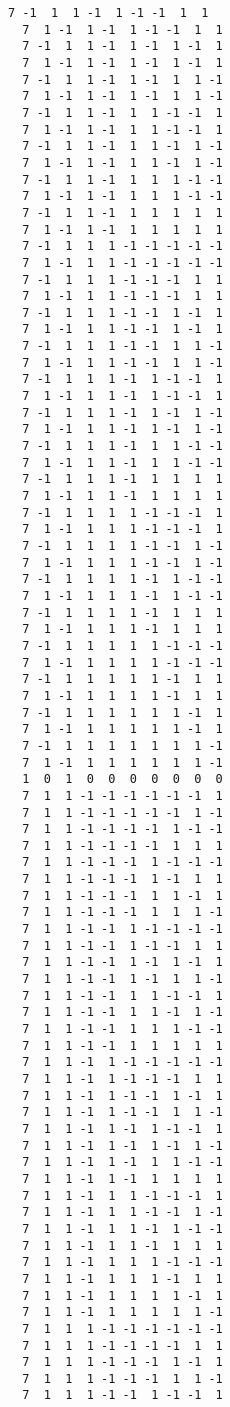 \documentclass[%
  twocolumn,
 showpacs,
 showkeys,
 preprintnumbers,
 amsmath,amssymb,
 aps,
  pra,
  longbibliography,
 floatfix,
 ]{revtex4-1}
\begin{document}
{\begin{lstlisting}[backgroundcolor=\color{yellow!10},framerule=0pt,breaklines=true, frame=tb]
  7 -1  1  1 -1  1 -1 -1  1  1
  7  1 -1  1 -1  1 -1 -1  1  1
  7 -1  1  1 -1  1 -1  1 -1  1
  7  1 -1  1 -1  1 -1  1 -1  1
  7 -1  1  1 -1  1 -1  1  1 -1
  7  1 -1  1 -1  1 -1  1  1 -1
  7 -1  1  1 -1  1  1 -1 -1  1
  7  1 -1  1 -1  1  1 -1 -1  1
  7 -1  1  1 -1  1  1 -1  1 -1
  7  1 -1  1 -1  1  1 -1  1 -1
  7 -1  1  1 -1  1  1  1 -1 -1
  7  1 -1  1 -1  1  1  1 -1 -1
  7 -1  1  1 -1  1  1  1  1  1
  7  1 -1  1 -1  1  1  1  1  1
  7 -1  1  1  1 -1 -1 -1 -1 -1
  7  1 -1  1  1 -1 -1 -1 -1 -1
  7 -1  1  1  1 -1 -1 -1  1  1
  7  1 -1  1  1 -1 -1 -1  1  1
  7 -1  1  1  1 -1 -1  1 -1  1
  7  1 -1  1  1 -1 -1  1 -1  1
  7 -1  1  1  1 -1 -1  1  1 -1
  7  1 -1  1  1 -1 -1  1  1 -1
  7 -1  1  1  1 -1  1 -1 -1  1
  7  1 -1  1  1 -1  1 -1 -1  1
  7 -1  1  1  1 -1  1 -1  1 -1
  7  1 -1  1  1 -1  1 -1  1 -1
  7 -1  1  1  1 -1  1  1 -1 -1
  7  1 -1  1  1 -1  1  1 -1 -1
  7 -1  1  1  1 -1  1  1  1  1
  7  1 -1  1  1 -1  1  1  1  1
  7 -1  1  1  1  1 -1 -1 -1  1
  7  1 -1  1  1  1 -1 -1 -1  1
  7 -1  1  1  1  1 -1 -1  1 -1
  7  1 -1  1  1  1 -1 -1  1 -1
  7 -1  1  1  1  1 -1  1 -1 -1
  7  1 -1  1  1  1 -1  1 -1 -1
  7 -1  1  1  1  1 -1  1  1  1
  7  1 -1  1  1  1 -1  1  1  1
  7 -1  1  1  1  1  1 -1 -1 -1
  7  1 -1  1  1  1  1 -1 -1 -1
  7 -1  1  1  1  1  1 -1  1  1
  7  1 -1  1  1  1  1 -1  1  1
  7 -1  1  1  1  1  1  1 -1  1
  7  1 -1  1  1  1  1  1 -1  1
  7 -1  1  1  1  1  1  1  1 -1
  7  1 -1  1  1  1  1  1  1 -1
  1  0  1  0  0  0  0  0  0  0
  7  1  1 -1 -1 -1 -1 -1 -1  1
  7  1  1 -1 -1 -1 -1 -1  1 -1
  7  1  1 -1 -1 -1 -1  1 -1 -1
  7  1  1 -1 -1 -1 -1  1  1  1
  7  1  1 -1 -1 -1  1 -1 -1 -1
  7  1  1 -1 -1 -1  1 -1  1  1
  7  1  1 -1 -1 -1  1  1 -1  1
  7  1  1 -1 -1 -1  1  1  1 -1
  7  1  1 -1 -1  1 -1 -1 -1 -1
  7  1  1 -1 -1  1 -1 -1  1  1
  7  1  1 -1 -1  1 -1  1 -1  1
  7  1  1 -1 -1  1 -1  1  1 -1
  7  1  1 -1 -1  1  1 -1 -1  1
  7  1  1 -1 -1  1  1 -1  1 -1
  7  1  1 -1 -1  1  1  1 -1 -1
  7  1  1 -1 -1  1  1  1  1  1
  7  1  1 -1  1 -1 -1 -1 -1 -1
  7  1  1 -1  1 -1 -1 -1  1  1
  7  1  1 -1  1 -1 -1  1 -1  1
  7  1  1 -1  1 -1 -1  1  1 -1
  7  1  1 -1  1 -1  1 -1 -1  1
  7  1  1 -1  1 -1  1 -1  1 -1
  7  1  1 -1  1 -1  1  1 -1 -1
  7  1  1 -1  1 -1  1  1  1  1
  7  1  1 -1  1  1 -1 -1 -1  1
  7  1  1 -1  1  1 -1 -1  1 -1
  7  1  1 -1  1  1 -1  1 -1 -1
  7  1  1 -1  1  1 -1  1  1  1
  7  1  1 -1  1  1  1 -1 -1 -1
  7  1  1 -1  1  1  1 -1  1  1
  7  1  1 -1  1  1  1  1 -1  1
  7  1  1 -1  1  1  1  1  1 -1
  7  1  1  1 -1 -1 -1 -1 -1 -1
  7  1  1  1 -1 -1 -1 -1  1  1
  7  1  1  1 -1 -1 -1  1 -1  1
  7  1  1  1 -1 -1 -1  1  1 -1
  7  1  1  1 -1 -1  1 -1 -1  1

\end{lstlisting}}
\end{document}
